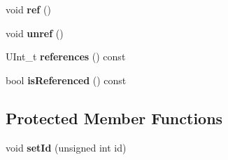 \begin{DoxyCompactItemize}
\item 
void {\bfseries ref} ()\label{classhistmgr_1_1HistMgr_1_1HistogramGroupData__t_a4bc6ddd417970ce1c00d53781b093bb4}

\item 
void {\bfseries unref} ()\label{classhistmgr_1_1HistMgr_1_1HistogramGroupData__t_ab8019cd94a1bdebebb805ddb5d972500}

\item 
UInt\_\-t {\bfseries references} () const \label{classhistmgr_1_1HistMgr_1_1HistogramGroupData__t_ab3e91d6c35a226699da929e9141fd2a9}

\item 
bool {\bfseries isReferenced} () const \label{classhistmgr_1_1HistMgr_1_1HistogramGroupData__t_abedbf506b91a7609e9a9b78a2039a26b}

\end{DoxyCompactItemize}
\subsection*{Protected Member Functions}
\begin{DoxyCompactItemize}
\item 
void {\bfseries setId} (unsigned int id)\label{classhistmgr_1_1HistMgr_1_1HistogramGroupData__t_a4b84f56cb6cff0f0d3fbcdd5213be5db}

\end{DoxyCompactItemize}
